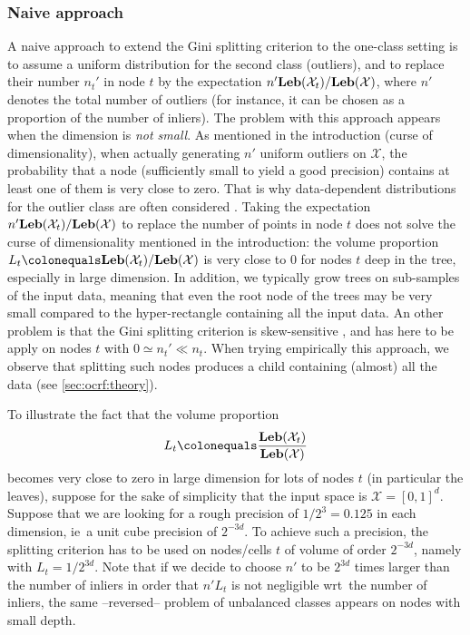 \subsubsection{Naive approach}
A naive approach to extend the Gini splitting criterion to the one-class
setting is to assume a  uniform distribution for the second class (outliers),
and to replace their number $n_t'$ in node $t$ by the expectation $n'
\mathbf{Leb}(\mathcal{X}_t) / \mathbf{Leb}(\mathcal{X})$, where $n'$ denotes the total number
of outliers (for instance, it can be chosen as a proportion of the number of
inliers).
%
The problem with this approach appears when the dimension is \emph{not small}.
As mentioned in the introduction (curse of dimensionality), when actually
generating $n'$ uniform outliers on $\mathcal{X}$, the probability that a node
(sufficiently small to yield a good precision) contains at least one of them is
very close to zero. That is why data-dependent distributions for the outlier
class are often considered \citep{Desir13, Shi2012}.
%
Taking the expectation $n' \mathbf{Leb}(\mathcal{X}_t) / \mathbf{Leb}(\mathcal{X})$ to replace
the number of points in node $t$ does not solve the curse of dimensionality
mentioned in the introduction: the volume proportion
$L_t\colonequals\Leb(\mathcal{X}_t) / \Leb(\mathcal{X})$ is very close to $0$
for nodes $t$ deep in the tree, especially in large dimension.
%
In addition, we typically grow trees on sub-samples of the input data, meaning
that even the root node of the trees may be very small compared to the
hyper-rectangle containing all the input data.
%
An other problem is that the Gini splitting criterion is skew-sensitive
\citep{Flach2003}, and has here to be apply on nodes $t$ with $0 \simeq n_t'
\ll n_t$. When trying empirically this approach, we observe that splitting such
nodes produces a child containing (almost) all the data (see
\cref{sec:ocrf:theory}).
%
\begin{example}
    To illustrate the fact that the volume proportion
    \begin{dmath*}
        L_t\colonequals \frac{\Leb(\mathcal{X}_t)}{\Leb(\mathcal{X})}
    \end{dmath*}
    becomes very close to zero in large dimension for lots of nodes $t$ (in
    particular the leaves), suppose for the sake of simplicity that the input
    space is $\mathcal{X} = [0,1]^d$. Suppose that we are looking for a rough
    precision of $1/2^3=0.125$ in each dimension, \acs{ie}~a unit cube
    precision of $2^{-3d}$.  To achieve such a precision, the splitting
    criterion has to be used on nodes/cells $t$ of volume of order $2^{-3d}$,
    namely with $L_t = 1/2^{3d}$.  Note that if we decide to choose $n'$ to be
    $2^{3d}$ times larger than the number of inliers in order that $n' L_{t}$
    is not negligible \acs{wrt}~the number of inliers, the same --reversed--
    problem of unbalanced classes appears on nodes with small depth.
\end{example}

